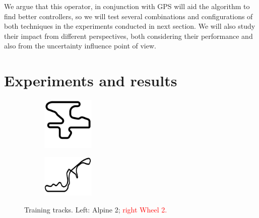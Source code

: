 \documentclass[10pt,journal,compsoc]{IEEEtran}
\begin{document}
We argue that this operator, in conjunction with GPS will aid the
algorithm to find better controllers, so we will test several
combinations and configurations of both techniques in the experiments
conducted in next section. We will also study their impact from
different perspectives, both considering their performance and also
from the uncertainty influence point of view. 



\section{Experiments and results}  
\label{sec:results}

%
\begin{figure}[!ht]	
\centering
\begin{subfigure}[b]{0.15\textwidth}
	\centering
	\includegraphics[width=2.5cm]{fig/alpine2.jpg}
	\label{fig:alpine2}
\end{subfigure}
\hfill
\begin{subfigure}[b]{0.15\textwidth}
	\centering
	\includegraphics[width=2.5cm]{fig/wheel2.jpg}
	\label{fig:wheel2}
\end{subfigure}
\caption{Training tracks. Left: Alpine 2; \textcolor{red}{right Wheel 2.}}
\label{fig:alpine2_wheel2track}
\end{figure}
\end{document}
